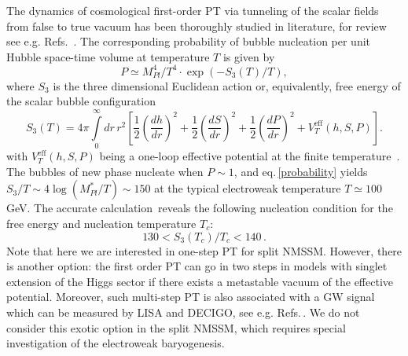 \documentclass[12pt]{article}
\begin{document}
The dynamics of cosmological first-order PT via tunneling of the
scalar fields from false to true vacuum  has been thoroughly studied 
in literature, for review see e.g.
Refs.~\cite{Espinosa:2010hh,Weir:2017wfa,Jinno:2017ixd}. The 
corresponding  probability of bubble nucleation per unit Hubble
space-time volume at temperature $T$ is given by  
\begin{equation}
  \label{probability}
P \simeq M_{Pl}^4 / T^4  \cdot \exp(-S_3(T)/T), 
\end{equation}
where $S_3$ is the three dimensional Euclidean action or,
equivalently, free energy of the scalar bubble configuration
\begin{equation}
  \label{action}
S_3(T) = 4\pi \int \limits_0^{\infty} dr \, r^2 \left[ 
\frac{1}{2} \left( \frac{dh }{dr}\right)^2+
\frac{1}{2} \left( \frac{dS }{dr}\right)^2+
\frac{1}{2} \left( \frac{dP }{dr}\right)^2+V_T^{\text{eff}}(h,S,P)
 \right].
\end{equation} 
with $V_T^{\text{eff}}(h,S,P)$ being a one-loop effective  potential  at 
the finite temperature~\cite{Demidov:2006zz}. The bubbles of new phase 
nucleate when $P\sim 1$, and eq.\,\eqref{probability} yields  
$S_3/T \sim 4 \log (M_{Pl}^*/T) \sim 150$ 
at the typical electroweak temperature $T \simeq 100$\,GeV. The accurate 
calculation\,\cite{Anderson:1991zb} reveals the following nucleation 
condition for the free energy and nucleation temperature $T_c$:  
\begin{equation}
130<S_3(T_c)/T_c<140\,.
\label{NuclCond}
\end{equation}
Note that here we are interested in one-step PT for split
NMSSM. However, there is another option:  the first order PT can go in two steps
in  models with singlet extension of the Higgs
sector if there exists a metastable vacuum of the effective
potential. Moreover, such multi-step PT is also associated with a
GW signal which can be measured by LISA and DECIGO, see
e.g. Refs.\,\cite{Huber:2015znp,Kang:2017mkl}.  We do not
  consider this exotic option in the split NMSSM, which requires
  special investigation of the electroweak baryogenesis. 

 
\end{document}
